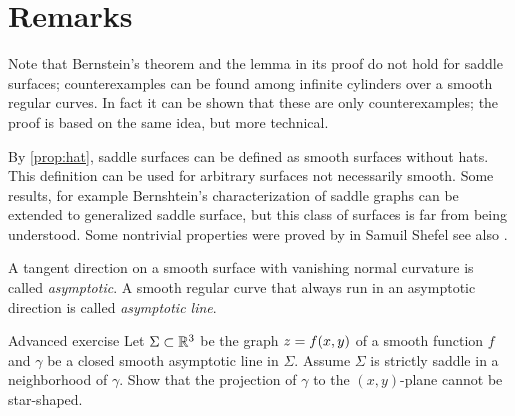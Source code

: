 \section*{Remarks}

Note that Bernstein's theorem and the lemma in its proof do not hold for saddle surfaces;
counterexamples can be found among infinite cylinders over a smooth regular curves.
In fact it can be shown that these are only counterexamples;
the proof is based on the same idea, but more technical.

By \ref{prop:hat}, saddle surfaces can be defined as smooth surfaces without hats.
This definition can be used for arbitrary surfaces not necessarily smooth.
Some results, for example Bernshtein's characterization of saddle graphs can be extended to generalized saddle surface, but this class of surfaces is far from being understood.
Some nontrivial properties were proved by in Samuil Shefel \cite{shefel} see also \cite[Capter 4]{akp}.

A tangent direction on a smooth surface with vanishing normal curvature is called \emph{asymptotic}.
A smooth regular curve that always run in an asymptotic direction is called
\emph{asymptotic line}.

\begin{thm}{Advanced exercise}
Let $\Sigma\subset \mathbb{R}^3$ be the graph $z\z=f(x,y)$
of a smooth function $f$ 
and $\gamma$ be a closed smooth asymptotic line in $\Sigma$.
Assume $\Sigma$ is strictly saddle in a neighborhood of $\gamma$.
Show that the projection of $\gamma$ to the $(x, y)$-plane cannot be star-shaped.
\end{thm}

